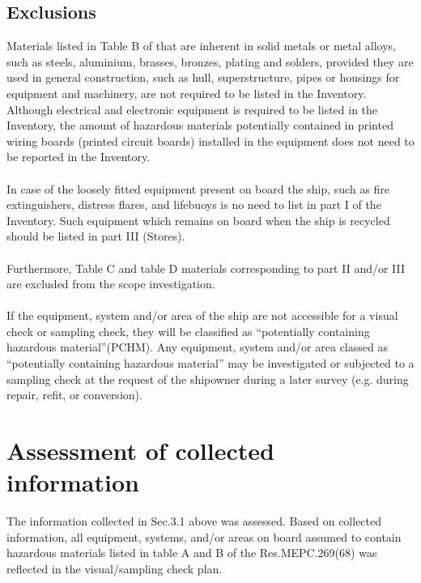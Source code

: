 \documentclass{article}
\begin{document}
\subsection{Exclusions}
Materials listed in Table B of that are inherent in solid metals or metal alloys,
such as steels, aluminium, brasses, bronzes, plating and solders, provided they
are used in general construction, such as hull, superstructure, pipes or housings
for equipment and machinery, are not required to be listed in the Inventory.
Although electrical and electronic equipment is required to be listed in the
Inventory, the amount of hazardous materials potentially contained in printed
wiring boards (printed circuit boards) installed in the equipment does not need
to be reported in the Inventory. \\ \\
In case of the loosely fitted equipment present on board the ship, such as fire
extinguishers, distress flares, and lifebuoys is no need to list in part I of the
Inventory. Such equipment which remains on board when the ship is recycled
should be listed in part III (Stores).\\ \\
Furthermore, Table C and table D materials corresponding to part II and/or III
are excluded from the scope investigation. \\ \\
If the equipment, system and/or area of the ship are not accessible for a visual
check or sampling check, they will be classified as “potentially containing
hazardous material”(PCHM). Any equipment, system and/or area classed as
“potentially containing hazardous material” may be investigated or subjected to
a sampling check at the request of the shipowner during a later survey (e.g.
during repair, refit, or conversion).

\section{Assessment of collected information}
The information collected in Sec.3.1 above was assessed. Based on collected
information, all equipment, systems, and/or areas on board assumed to contain
hazardous materials listed in table A and B of the Res.MEPC.269(68) was
reflected in the visual/sampling check plan.
\end{document}
